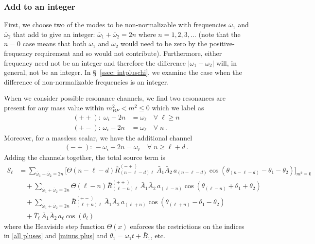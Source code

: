 \documentclass[letterpaper,11pt]{article}
\newcommand{\oone}{\overline{\omega}_1}
\newcommand{\otwo}{\overline{\omega}_2}
\begin{document}
\subsubsection{Add to an integer}
\label{ssec: add to integer}

First, we choose two of the modes to be non-normalizable with frequencies $\oone$ and $\otwo$ that add to give an integer: $\oone+ \otwo = 2n$ where $n = 1, 2, 3, \ldots$ (note that the $n = 0$ case means that both $\oone$ and $\otwo$ would need to be zero by the positive-frequency requirement and so would not contribute). Furthermore, either frequency need not be an integer and therefore the difference $|\oone - \otwo|$ will, in general, not be an integer. In \S\!~\ref{ssec: intpluschi}, we examine the case when the difference of non-normalizable frequencies is an integer.

When we consider possible resonance channels, we find two resonances are present for any mass value within $m^2_{BF} < m^2 \leq 0$ which we label as  
\begin{align}
\label{all pluses}
(++): \; \omega_i + 2n &= \omega_\ell \quad \forall \; \ell \geq n \\
(+-): \, \omega_i - 2n &=\omega_\ell \quad \forall \; n \, .
\end{align}
Moreover, for a massless scalar, we have the additional channel
\begin{align}
\label{minus plus}
(-+): \, -\omega_i + 2n = \omega_\ell \quad \forall \; n \geq \ell + d \, .
\end{align}
Adding the channels together, the total source term is
\begin{align}
\label{add to integer}
S_\ell &=  \!\!\!\! \sum_{\oone + \otwo = 2n}\bigg[ \Theta\left( n - \ell - d \right) \overline{R}^{(-+)}_{(n - \ell - d) \ell} \ \bar A_1 \bar A_2 \, a_{(n - \ell - d)} \cos \left( \theta_{(n - \ell - d)} - \theta_1 - \theta_2 \right) \bigg]_{m^2 = 0}  \nonumber \\ 
%
&  \quad + \!\!\!\! \sum_{\oone + \otwo = 2n} \!\!\!\! \Theta \left( \ell - n \right)  \overline{R}^{(++)}_{(\ell - n)\ell} \, \bar A_1 \bar A_2 \, a_{(\ell - n)} \cos \left( \theta_{(\ell - n)} + \theta_1 + \theta_2 \right) \nonumber \\
%
& \quad  + \!\!\!\! \sum_{\oone + \otwo = 2n} \!\!\!\! \overline{R}^{(+-)}_{(\ell + n) \ell} \, \bar A_1 \bar A_2 \, a_{(\ell + n)} \cos\left( \theta_{(\ell + n)} - \theta_1 - \theta_2 \right) \nonumber \\
%
& \quad + \overline{T}_{\ell} \, \bar A_1 \bar A_2 \, a_\ell \cos \left( \theta_\ell \right)
\end{align}
where the Heaviside step function $\Theta(x)$ enforces the restrictions on the indices in \eqref{all pluses} and \eqref{minus plus} and $\theta_1 = \oone t + \bar B_1$, etc. 
\end{document}
